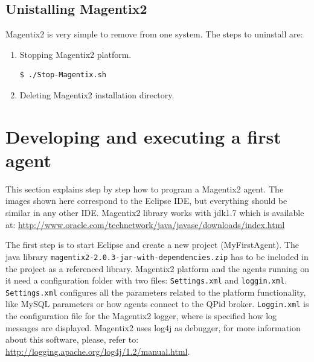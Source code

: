 \subsection{Unistalling Magentix2}

Magentix2 is very simple to remove from one system. The steps to uninstall are:
\begin{enumerate}
\item Stopping Magentix2 platform.
\begin{verbatim}
$ ./Stop-Magentix.sh
\end{verbatim}
\item Deleting Magentix2 installation directory.
\end{enumerate}


\section{Developing and executing a first agent}\label{sec:devel1stAgent}
This section explains step by step how to program a Magentix2 agent. The images shown here correspond to the Eclipse IDE, but everything should be similar in any other IDE. Magentix2 library works with jdk1.7 which is available at: \url{http://www.oracle.com/technetwork/java/javase/downloads/index.html}

The first step is to start Eclipse and create a new project (MyFirstAgent). The java library \texttt{magentix2-2.0.3-jar-with-dependencies.zip} has to be included in the project as a referenced library. Magentix2 platform and the agents running on it need a configuration folder with two files: \texttt{Settings.xml} and \texttt{loggin.xml}. \texttt{Settings.xml} configures all the parameters related to the platform functionality, like MySQL parameters or how agents connect to the QPid broker. \texttt{Loggin.xml} is the configuration file for the Magentix2 logger, where is specified how log messages are displayed. Magentix2 uses log4j as debugger, for more information about this software, please, refer to: \url{http://logging.apache.org/log4j/1.2/manual.html}. 

